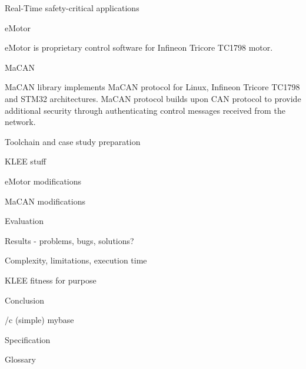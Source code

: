 \sec Real-Time safety-critical applications

\secc eMotor

eMotor is proprietary control software for Infineon Tricore TC1798 motor.

\secc MaCAN

MaCAN library  implements MaCAN protocol for Linux, Infineon Tricore TC1798 and STM32 architectures.
MaCAN protocol builds upon CAN protocol to provide additional security through authenticating control messages
received from the network.

\chap Toolchain and case study preparation

\sec KLEE stuff


\sec eMotor modifications

\sec MaCAN modifications

\chap Evaluation

\sec Results - problems, bugs, solutions?


\sec Complexity, limitations, execution time

\sec KLEE fitness for purpose

\chap Conclusion



\bibchap
\usebib/c (simple) mybase


\app Specification



\app Glossary\par
\makeglos

\nextoddpage

\bye
